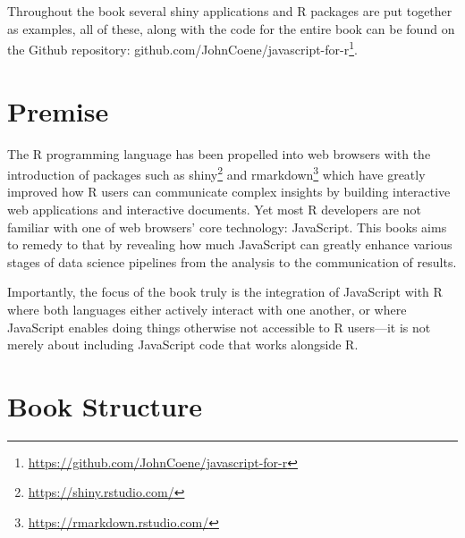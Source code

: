 \documentclass[
]{krantz}
\renewcommand{\href}[2]{#2\footnote{\url{#1}}}
\begin{document}
Throughout the book several shiny applications and R packages are put together as examples, all of these, along with the code for the entire book can be found on the Github repository: \href{https://github.com/JohnCoene/javascript-for-r}{github.com/JohnCoene/javascript-for-r}.

\hypertarget{premise}{%
\section*{Premise}\label{premise}}


The R programming language has been propelled into web browsers with the introduction of packages such as \href{https://shiny.rstudio.com/}{shiny} \citep{R-shiny} and \href{https://rmarkdown.rstudio.com/}{rmarkdown} \citep{R-rmarkdown} which have greatly improved how R users can communicate complex insights by building interactive web applications and interactive documents. Yet most R developers are not familiar with one of web browsers' core technology: JavaScript. This books aims to remedy to that by revealing how much JavaScript can greatly enhance various stages of data science pipelines from the analysis to the communication of results.

Importantly, the focus of the book truly is the integration of JavaScript with R where both languages either actively interact with one another, or where JavaScript enables doing things otherwise not accessible to R users---it is not merely about including JavaScript code that works alongside R.

\hypertarget{book-structure}{%
\section*{Book Structure}\label{book-structure}}
\end{document}
